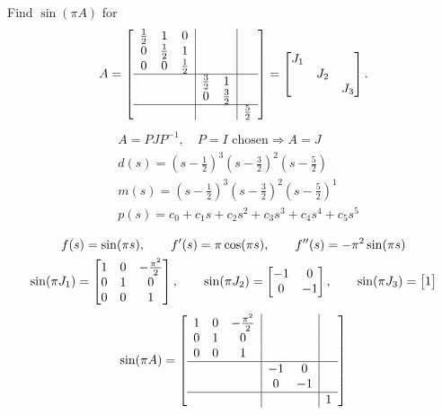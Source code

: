 \begin{example}
Find $\sin(\pi A)$ for
\[
A = \left[\begin{array}{ccc|cc|c}
\frac12 & 1 & 0 & & & \\
0 & \frac12 & 1 & & & \\
0 & 0 & \frac12 & & & \\ \hline
 & & & \frac32 & 1 & \\
 & & & 0 & \frac32 & \\ \hline
 & & & & & \frac52
\end{array}\right]
= \begin{bmatrix}J_1 & & \\ & J_2 & \\ & & J_3\end{bmatrix}.
\]
\begin{align*}
&A = PJP^{-1}, \quad P = I \text{ chosen} \Rightarrow A = J\\
&d(s) = \left(s-\tfrac12\right)^3\left(s-\tfrac32\right)^2\left(s-\tfrac52\right)\\
&m(s) = \left(s-\tfrac12\right)^3\left(s-\tfrac32\right)^2\left(s-\tfrac52\right)^1\\
&p(s) = c_0 + c_1s + c_2s^2 + c_3s^3 + c_4s^4 + c_5s^5
\end{align*}

\begin{gather*}
f(s) = \sin(\pi s), \qquad f'(s) = \pi\cos(\pi s), \qquad f''(s) = -\pi^2\sin(\pi s)
\\
\sin(\pi J_1) = \begin{bmatrix}1 & 0 & -\frac{\pi^2}{2}\\ 0 & 1 & 0\\ 0 & 0 & 1\end{bmatrix},
\qquad
\sin(\pi J_2) = \begin{bmatrix}-1 & 0\\ 0 & -1\end{bmatrix},
\qquad
\sin(\pi J_3) = \begin{bmatrix}1\end{bmatrix}
\end{gather*}
\[
\sin(\pi A) = \left[\begin{array}{ccc|cc|c}
1 & 0 & -\frac{\pi^2}{2} & & & \\
0 & 1 & 0 & & & \\
0 & 0 & 1 & & & \\ \hline
 & & & -1 & 0 & \\
 & & & 0 & -1 & \\ \hline
 & & & & & 1
\end{array}\right]
\]
\end{example}

